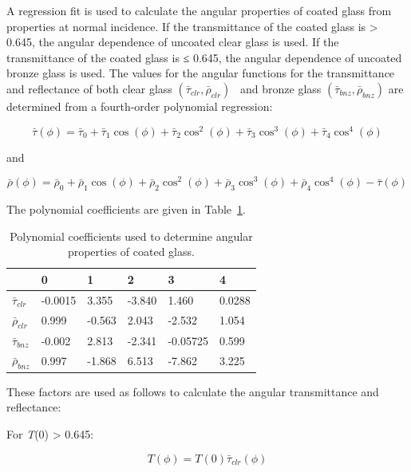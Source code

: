 A regression fit is used to calculate the angular properties of coated glass from properties at normal incidence. If the transmittance of the coated glass is \textgreater{} 0.645, the angular dependence of uncoated clear glass is used. If the transmittance of the coated glass is ≤ 0.645, the angular dependence of uncoated bronze glass is used. The values for the angular functions for the transmittance and reflectance of both clear glass \(({\bar \tau_{clr}},{\bar \rho_{clr}})\) ~and bronze glass \(({\bar \tau_{bnz}},{\bar \rho_{bnz}})\) are determined from a fourth-order polynomial regression:

\begin{equation}
\bar \tau (\phi ) = {\bar \tau_0} + {\bar \tau_1}\cos (\phi ) + {\bar \tau_2}{\cos ^2}(\phi ) + {\bar \tau_3}{\cos ^3}(\phi ) + {\bar \tau_4}{\cos ^4}(\phi )
\end{equation}

and

\begin{equation}
\bar \rho (\phi ) = {\bar \rho_0} + {\bar \rho_1}\cos (\phi ) + {\bar \rho_2}{\cos ^2}(\phi ) + {\bar \rho_3}{\cos ^3}(\phi ) + {\bar \rho_4}{\cos ^4}(\phi ) - \bar \tau (\phi )
\end{equation}

The polynomial coefficients are given in Table~\ref{table:polynomial-coefficients-used-to-determine}.

\begin{longtable}[c]{p{1.0in}p{1.0in}p{1.0in}p{1.0in}p{1.0in}p{1.0in}}
\caption{Polynomial coefficients used to determine angular properties of coated glass. \label{table:polynomial-coefficients-used-to-determine}}\\
\toprule 
~ & 0 & 1 & 2 & 3 & 4 \tabularnewline \midrule \endhead
$\bar{\tau}_{clr}$ & -0.0015 & 3.355 & -3.840 & 1.460 & 0.0288 \tabularnewline
$\bar{\rho}_{clr}$ & 0.999 & -0.563 & 2.043 & -2.532 & 1.054 \tabularnewline
$\bar{\tau}_{bnz}$ & -0.002 & 2.813 & -2.341 & -0.05725 & 0.599 \tabularnewline
$\bar{\rho}_{bnz}$ & 0.997 & -1.868 & 6.513 & -7.862 & 3.225 \tabularnewline
\bottomrule
\end{longtable}

These factors are used as follows to calculate the angular transmittance and reflectance:

For \emph{T}(0) \textgreater{} 0.645:

\begin{equation}
T(\phi ) = T(0){\bar \tau_{clr}}(\phi )
\end{equation}

